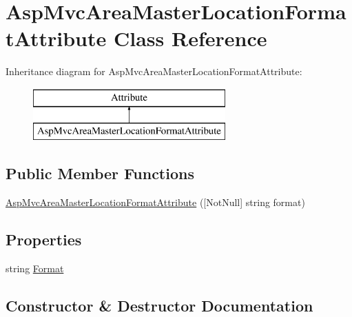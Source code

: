 \hypertarget{class_asp_mvc_area_master_location_format_attribute}{}\section{Asp\+Mvc\+Area\+Master\+Location\+Format\+Attribute Class Reference}
\label{class_asp_mvc_area_master_location_format_attribute}
Inheritance diagram for Asp\+Mvc\+Area\+Master\+Location\+Format\+Attribute\+:\begin{figure}[H]
\begin{center}
\leavevmode
\includegraphics[height=2.000000cm]{class_asp_mvc_area_master_location_format_attribute}
\end{center}
\end{figure}
\subsection*{Public Member Functions}
\begin{DoxyCompactItemize}
\item 
\mbox{\hyperlink{class_asp_mvc_area_master_location_format_attribute_af7f7380375d3f39228ae4d99b7e99b44}{Asp\+Mvc\+Area\+Master\+Location\+Format\+Attribute}} (\mbox{[}Not\+Null\mbox{]} string format)
\end{DoxyCompactItemize}
\subsection*{Properties}
\begin{DoxyCompactItemize}
\item 
string \mbox{\hyperlink{class_asp_mvc_area_master_location_format_attribute_a4cb37b1a8f40ba0e5285cd1e602cf1c3}{Format}}
\end{DoxyCompactItemize}


\subsection{Constructor \& Destructor Documentation}
\mbox{\label{class_asp_mvc_area_master_location_format_attribute_af7f7380375d3f39228ae4d99b7e99b44}} 
